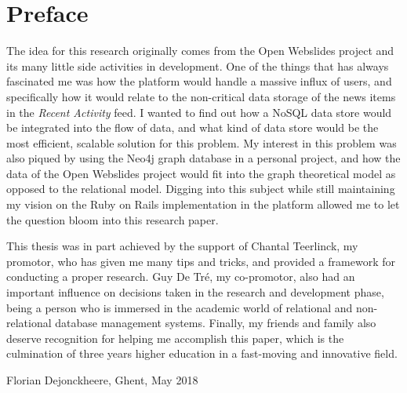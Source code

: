 
\chapter*{Preface}
\label{ch:preface}

The idea for this research originally comes from the Open Webslides project and its many little side activities in development.
One of the things that has always fascinated me was how the platform would handle a massive influx of users, and specifically how it would relate to the non-critical data storage of the news items in the \textit{Recent Activity} feed.
I wanted to find out how a NoSQL data store would be integrated into the flow of data, and what kind of data store would be the most efficient, scalable solution for this problem.
My interest in this problem was also piqued by using the Neo4j graph database in a personal project, and how the data of the Open Webslides project would fit into the graph theoretical model as opposed to the relational model.
Digging into this subject while still maintaining my vision on the Ruby on Rails implementation in the platform allowed me to let the question bloom into this research paper.

This thesis was in part achieved by the support of Chantal Teerlinck, my promotor, who has given me many tips and tricks, and provided a framework for conducting a proper research.
Guy De Tr\'e, my co-promotor, also had an important influence on decisions taken in the research and development phase, being a person who is immersed in the academic world of relational and non-relational database management systems.
Finally, my friends and family also deserve recognition for helping me accomplish this paper, which is the culmination of three years higher education in a fast-moving and innovative field.

\begin {flushright}
  Florian Dejonckheere, Ghent, May 2018
\end {flushright}
